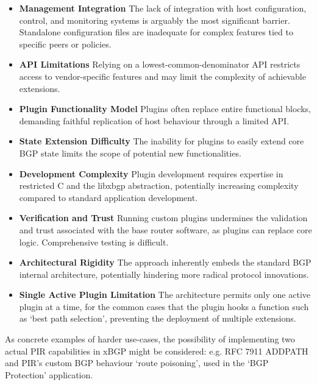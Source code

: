 \begin{itemize}
    \item \textbf{Management Integration} The lack of integration with host configuration, control, and monitoring systems is arguably the most significant barrier. Standalone configuration files are inadequate for complex features tied to specific peers or policies.
    \item \textbf{API Limitations} Relying on a lowest-common-denominator API restricts access to vendor-specific features and may limit the complexity of achievable extensions.
    \item \textbf{Plugin Functionality Model} Plugins often replace entire functional blocks, demanding faithful replication of host behaviour through a limited API.
    \item \textbf{State Extension Difficulty} The inability for plugins to easily extend core BGP state limits the scope of potential new functionalities.
    \item \textbf{Development Complexity} Plugin development requires expertise in restricted C and the libxbgp abstraction, potentially increasing complexity compared to standard application development.
    \item \textbf{Verification and Trust} Running custom plugins undermines the validation and trust associated with the base router software, as plugins can replace core logic. Comprehensive testing is difficult.
    \item \textbf{Architectural Rigidity} The approach inherently embeds the standard BGP internal architecture, potentially hindering more radical protocol innovations.
    \item \textbf{Single Active Plugin Limitation} The architecture permits only one active plugin at a time, for the common cases that the plugin hooks a function such as `best path selection', preventing the deployment of multiple extensions.
\end{itemize}

As concrete examples of harder use-cases, the possibility of implementing two actual PIR capabilities in xBGP might be considered: e.g. RFC 7911 ADDPATH and PIR's custom BGP behaviour `route poisoning', used in the `BGP Protection' application.

